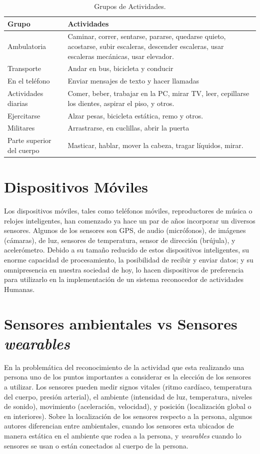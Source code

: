 \begin{table}[htbp]
\centering{}%
\begin{tabular}{|l|p{9cm}|}
\hline 
\textbf{Grupo}  & \textbf{Actividades} \tabularnewline
\hline 
\hline 
Ambulatoria  & Caminar, correr, sentarse, pararse, quedarse quieto, acostarse, subir
escaleras, descender escaleras, usar escaleras mecánicas, usar elevador.\tabularnewline
\hline 
Transporte  & Andar en bus, bicicleta y conducir \tabularnewline
\hline 
En el teléfono  & Enviar mensajes de texto y hacer llamadas \tabularnewline
\hline 
Actividades diarias  & Comer, beber, trabajar en la PC, mirar TV, leer, cepillarse los dientes,
aspirar el piso, y otros. \tabularnewline
\hline 
Ejercitarse  & Alzar pesas, bicicleta estática, remo y otros. \tabularnewline
\hline 
Militares  & Arrastrarse, en cuclillas, abrir la puerta \tabularnewline
\hline 
Parte superior del cuerpo  & Masticar, hablar, mover la cabeza, tragar líquidos, mirar. \tabularnewline
\hline 
\end{tabular}\caption{Grupos de Actividades.}
\label{tabla:sencilla} 
\end{table}


\section{Dispositivos Móviles}

\label{sec23:dispositivos-moviles} Los dispositivos móviles, tales
como teléfonos móviles, reproductores de música o relojes inteligentes,
han comenzado ya hace un par de años incorporar un diversos sensores.
Algunos de los sensores son GPS, de audio (micrófonos), de imágenes
(cámaras), de luz, sensores de temperatura, sensor de dirección (brújula),
y acelerómetro. Debido a su tamaño reducido de estos dispositivos
inteligentes, su enorme capacidad de procesamiento, la posibilidad
de recibir y enviar datos; y su omnipresencia en nuestra sociedad
de hoy, lo hacen dispositivos de preferencia para utilizarlo en la
implementación de un sistema reconocedor de actividades Humanas.

\section{Sensores ambientales vs Sensores \emph{wearables}}

\label{sec24:sensores} En la problemática del reconocimiento de la
actividad que esta realizando una persona uno de los puntos importantes
a considerar es la elección de los sensores a utilizar. Los sensores
pueden medir signos vitales (ritmo cardíaco, temperatura del cuerpo,
presión arterial), el ambiente (intensidad de luz, temperatura, niveles
de sonido), movimiento (aceleración, velocidad), y posición (localización
global o en interiores). Sobre la localización de los sensores respecto
a la persona, algunos autores \cite{ReyesOrtiz2015} diferencian entre
ambientales, cuando los sensores esta ubicados de manera estática
en el ambiente que rodea a la persona, y \emph{wearables} cuando lo
sensores se usan o están conectados al cuerpo de la persona.

